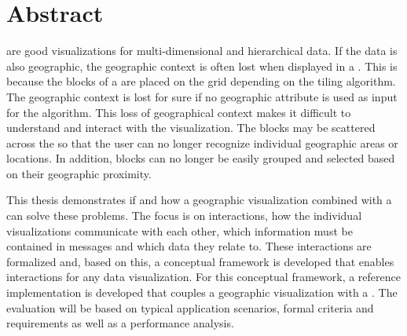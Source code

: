 \chapter*{Abstract}


\tmaps{} are good visualizations for multi-dimensional and hierarchical data.
If the data is also geographic, the geographic context is often lost when displayed in a \tmap{}.
This is because the blocks of a \tmap{} are placed on the grid depending on the tiling algorithm.
The geographic context is lost for sure if no geographic attribute is used as input for the algorithm.
This loss of geographical context makes it difficult to understand and interact with the visualization.
The blocks may be scattered across the \tmap{} so that the user can no longer recognize individual geographic areas or locations.
In addition, blocks can no longer be easily grouped and selected based on their geographic proximity.

This thesis demonstrates if and how a geographic visualization combined with a \tmap{} can solve these problems.
The focus is on interactions, how the individual visualizations communicate with each other, which information must be contained in messages and which data they relate to.
These interactions are formalized and, based on this, a conceptual framework is developed that enables interactions for any data visualization.
For this conceptual framework, a reference implementation is developed that couples a geographic visualization with a \tmap{}.
The evaluation will be based on typical application scenarios, formal criteria and requirements as well as a performance analysis.

